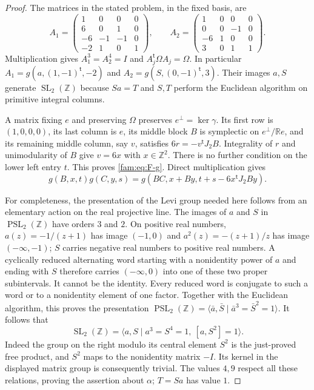 \begin{proof}
The matrices in the stated problem, in the fixed basis, are
\[
 A_1=\begin{pmatrix}1&0&0&0\\6&0&1&0\\-6&-1&-1&0\\-2&1&0&1\end{pmatrix},
 \qquad
 A_2=\begin{pmatrix}1&0&0&0\\0&0&-1&0\\-6&1&0&0\\3&0&1&1\end{pmatrix}.
\]
Multiplication gives $A_1^3=A_2^4=I$ and
$A_j^{\mathsf t}\Omega A_j=\Omega$.  In particular
$A_1=g(a,(1,-1)^{\mathsf t},-2)$ and
$A_2=g(S,(0,-1)^{\mathsf t},3)$.  Their images $a,S$ generate
$\operatorname{SL}_2(\mathbb Z)$ because $Sa=T$ and $S,T$ perform the
Euclidean algorithm on primitive integral columns.

A matrix fixing $e$ and preserving $\Omega$ preserves
$e^{\perp}=\ker\gamma$.  Its first row is $(1,0,0,0)$, its last column is
$e$, its middle block $B$ is symplectic on
$e^{\perp}/\mathbb Re$, and its remaining middle column, say $v$, satisfies
$6r=-v^{\mathsf t}J_2B$.  Integrality of $r$ and unimodularity of $B$
give $v=6x$ with $x\in\mathbb Z^2$.  There is no further condition on
the lower left entry $t$.  This proves \eqref{fam:eq:F-g}.  Direct multiplication
gives
\begin{equation}\label{fam:eq:F-law}
 g(B,x,t)g(C,y,s)
 =g(BC,x+By,t+s-6x^{\mathsf t}J_2By).
\end{equation}

For completeness, the presentation of the Levi group needed here follows
from an elementary action on the real projective line.  The images of $a$
and $S$ in $\operatorname{PSL}_2(\mathbb Z)$ have orders $3$ and $2$.
On positive real numbers, $a(z)=-1/(z+1)$ has image $(-1,0)$ and
$a^2(z)=-(z+1)/z$ has image $(-\infty,-1)$; $S$ carries negative real
numbers to positive real numbers.  A cyclically reduced alternating word
starting with a nonidentity power of $a$ and ending with $S$ therefore
carries $(-\infty,0)$ into one of these two proper subintervals.  It cannot
be the identity.  Every reduced word is conjugate to such a word or to a
nonidentity element of one factor.  Together with the Euclidean algorithm,
this proves the presentation
$\operatorname{PSL}_2(\mathbb Z)=\langle\bar a,\bar S\mid
\bar a^3=\bar S^2=1\rangle$.  It follows that
\begin{equation}\label{fam:eq:F-SLpresentation}
 \operatorname{SL}_2(\mathbb Z)=
 \langle a,S\mid a^3=S^4=1,\ [a,S^2]=1\rangle.
\end{equation}
Indeed the group on the right modulo its central element $S^2$ is the
just-proved free product, and $S^2$ maps to the nonidentity matrix $-I$.
Its kernel in the displayed matrix group is consequently trivial.
The values $4,9$ respect all these relations, proving the assertion about
$\alpha$; $T=Sa$ has value $1$.


\end{proof}

